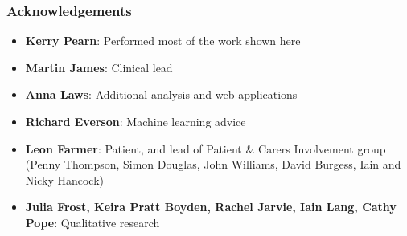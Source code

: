 \begin{frame}
\frametitle{Acknowledgements}

\begin{itemize}
    \setlength{\itemsep}{4mm}
    \item \textbf{Kerry Pearn}: Performed most of the work shown here
    \item \textbf{Martin James}: Clinical lead
    \item \textbf{Anna Laws}: Additional analysis and web applications
    \item \textbf{Richard Everson}: Machine learning advice
    \item \textbf{Leon Farmer}: Patient, and lead of Patient \& Carers Involvement group (Penny Thompson, Simon Douglas, John Williams, David Burgess, Iain and Nicky Hancock)
    \item \textbf{Julia Frost, Keira Pratt Boyden, Rachel Jarvie, Iain Lang, Cathy Pope}: Qualitative research
\end{itemize}
\end{frame}
